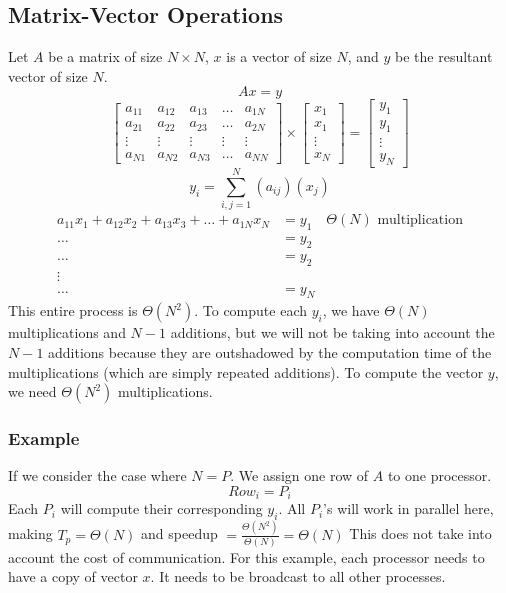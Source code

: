 \documentclass[letterpaper, 12pt]{math}
\begin{document}
\subsection*{Matrix-Vector Operations}
Let \( A \) be a matrix of size \( N\times N \), \( x \) is a vector of size
\( N \), and \( y \) be the resultant vector of size \( N \).
\[ Ax = y \]
\[ \begin{bmatrix}
    a_{11} & a_{12} & a_{13} & \dots & a_{1N} \\
    a_{21} & a_{22} & a_{23} & \dots & a_{2N} \\
    \vdots & \vdots & \vdots & \vdots & \vdots \\
    a_{N1} & a_{N2} & a_{N3} & \dots & a_{NN}
  \end{bmatrix}\times\begin{bmatrix}
    x_1 \\ x_1 \\ \vdots \\ x_N
  \end{bmatrix} = \begin{bmatrix}
    y_1 \\ y_1 \\ \vdots \\ y_N
  \end{bmatrix}
\]
\[ y_i = \sum_{i,j=1}^{N}(a_{ij})(x_j) \]
\begin{align*}
  a_{11}x_1+a_{12}x_2+a_{13}x_3+\dots+a_{1N}x_N &= y_1
    \quad \Theta(N)\text{ multiplication} \\
  \dots &= y_2 \\
  \dots &= y_2 \\
  \vdots \\
  \dots &= y_N
\end{align*}
This entire process is \( \Theta(N^2) \). To compute each \( y_i \), we have
\( \Theta(N) \) multiplications and \( N-1 \) additions, but we will not be
taking into account the \( N-1 \) additions because they are outshadowed by the
computation time of the multiplications (which are simply repeated additions).
To compute the vector \( y \), we need \( \Theta(N^2) \) multiplications.

\subsubsection*{Example}
If we consider the case where \( N = P \). We assign one row of \( A \) to one
processor.
\[ Row_i = P_i \]
Each \( P_i \) will compute their corresponding \( y_i \). All \( P_i \)'s will
work in parallel here, making \( T_p = \Theta(N) \) and speedup
\( = \frac{\Theta(N^2)}{\Theta(N)} = \Theta(N) \)
This does not take into account the cost of communication. For this example,
each processor needs to have a copy of vector \( x \). It needs to be broadcast
to all other processes.
\end{document}
